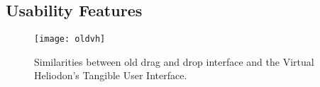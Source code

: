 	\subsection{Usability Features}

		\begin{figure}[t]
		\centering
		\texttt{[image: oldvh]}
		\caption{
		Similarities between old drag and drop interface and the Virtual Heliodon's Tangible User Interface. 
		}
		\label{fig:oldvh}
		\end{figure}

